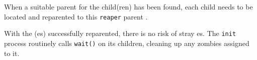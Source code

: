 When a suitable parent for the child(ren) has been found, each child needs to be located and reparented to this \texttt{reaper} parent .

With the (es) successfully reparented, there is no risk of stray es.
The \texttt{init} process routinely calls \texttt{wait()} on its children, cleaning up any zombies assigned to it.

